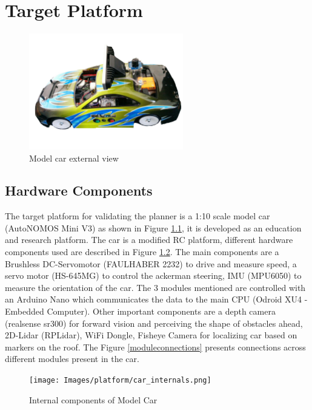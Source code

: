 \chapter{Target Platform}
\label{vehicle_info}

\begin{figure}[H]
	\centering
	\includegraphics[width=0.6\textwidth]{Images/platform/car.jpg}
	\caption{Model car external view}
	\label{model_car}
\end{figure}

\section{Hardware Components}
The target platform for validating the planner is a 1:10 scale model car (AutoNOMOS Mini V3) as shown in Figure \ref{model_car}, it is developed as an education and research platform. The car is a modified RC platform, different hardware components used are described in Figure \ref{internalcar}. The main components are a Brushless DC-Servomotor (FAULHABER 2232) to drive and measure speed, a servo motor (HS-645MG) to control the ackerman steering, IMU (MPU6050) to measure the orientation of the car. The 3 modules mentioned are controlled with an Arduino Nano which communicates the data to the main CPU (Odroid XU4 - Embedded Computer). Other important components are a depth camera (realsense sr300) for forward vision and perceiving the shape of obstacles ahead, 2D-Lidar (RPLidar), WiFi Dongle, Fisheye Camera for localizing car based on markers on the roof. The Figure \ref{moduleconnections} presents connections across different modules present in the car.
\begin{figure}
	\centering
	\texttt{[image: Images/platform/car\_internals.png]}
	\caption{Internal components of Model Car}
	\label{internalcar}
\end{figure}


